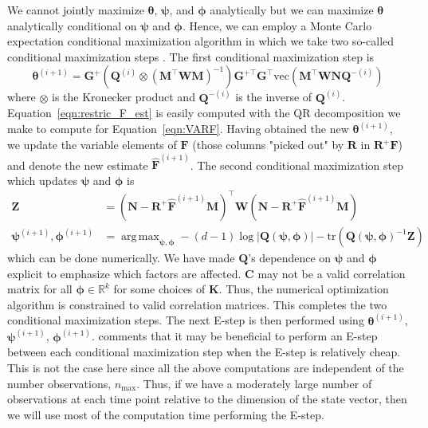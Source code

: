 \documentclass[notitlepage]{article}
\DeclareMathOperator*{\argmax}{arg\,max}
\renewcommand{\vec}[1]{\bm{#1}}
\newcommand{\mat}[1]{\mathbf{#1}}
\newcommand{\Lparen}[1]{\left( #1\right)}
\newcommand{\Lvert}[1]{\left\vert #1\right\vert}
\newcommand{\optor}[2]{#1\Lparen{#2}}
\newcommand{\vecOP}[1]{\optor{\text{vec}}{#1}}
\newcommand{\nPeriods}{d}
\newcommand{\nMax}{n_{\text{max}}}
\begin{document}
We cannot jointly maximize $\vec{\theta}$, $\vec{\psi}$, and $\vec{\phi}$ analytically but we can maximize $\vec{\theta}$ analytically conditional on $\vec{\psi}$ and $\vec{\phi}$. Hence, we can employ a Monte Carlo expectation conditional maximization algorithm in which we take two so-called conditional maximization steps \citep[see][for the, non-Monte Carlo, expectation maximization algorithm]{meng93}. 
The first conditional maximization step is %
%
\begin{equation}\label{eqn:restric_F_est}
\vec{\theta}^{(i + 1)} =
	\mat{G}^+
	\Lparen{\mat{Q}^{(i)} \otimes \Lparen{\mat{M}^\top\mat{W}\mat{M}}^{-1}}
	\mat{G}^{+\top}\mat{G}^\top	
	\vecOP{\mat{M}^\top\mat{W}\mat{N}\mat{Q}^{-(i)}}
\end{equation}%
% 
where $\otimes$ is the Kronecker product and $\mat{Q}^{-(i)}$ is the inverse 
of $\mat{Q}^{(i)}$. Equation~\eqref{eqn:restric_F_est} is easily computed 
with the QR decomposition we 
make to compute for Equation~\eqref{eqn:VARF}. Having obtained the new 
$\vec{\theta}^{(i + 1)}$, we update the variable elements of $\mat{F}$ (those 
columns "picked out" by $\mat{R}$ in $\mat{R}^+\mat{F}$) and denote the new 
estimate $\widehat{\mat{F}}^{(i + 1)}$. The second conditional maximization 
step which updates $\vec{\psi}$ and $\vec{\phi}$ is %
%
\begin{align*}
\mat{Z} &= \Lparen{\mat{N} - \mat{R}^+\widehat{\mat{F}}^{(i +1)}\mat{M}}^\top\mat{W}
           \Lparen{\mat{N} - \mat{R}^+\widehat{\mat{F}}^{(i +1)}\mat{M}} \\
\vec{\psi}^{(i+1)},\vec{\phi}^{(i+1)} &= \argmax_{\vec{\psi},\vec{\phi}} 
   -(\nPeriods - 1)\log\Lvert{\mat{Q}(\vec{\psi},\vec{\phi})}
   -\text{tr}\Lparen{\mat{Q}(\vec{\psi},\vec{\phi})^{-1}\mat{Z}}
\end{align*}%
% 
which can be done numerically. We have made $\mat{Q}$'s dependence on $\vec{\psi}$ and $\vec{\phi}$ explicit to emphasize which factors are affected. $\mat{C}$ may not be a valid correlation matrix for all $\vec\phi\in\mathbb{R}^k$ for some choices of $\mat{K}$. Thus, the numerical optimization algorithm is constrained to valid correlation matrices. This completes the two conditional maximization steps. The next E-step is then performed using $\vec{\theta}^{(i + 1)}$, $\vec{\psi}^{(i +1)}$, $\vec{\phi}^{(i + 1)}$. \citet[][see the discussion]{meng93} comments that it may be beneficial to perform an E-step between each conditional maximization step when the E-step is relatively cheap. 
This is not the case here since all the above computations are independent 
of the number observations, $\nMax$.
Thus, if we have a moderately large number of observations at each time point relative to 
the dimension of the state vector, then we will use most of the 
computation time performing the E-step.
\end{document}
